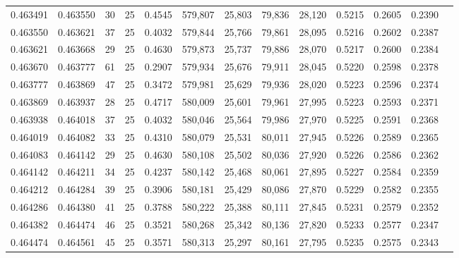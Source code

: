 \begin{tabular}{rrrrrrrrrrrrr}
0.463491 & 0.463550 &    30 &  25 &                                     0.4545 & 579,807 &  25,803 &  79,836 &  28,120 & 0.5215 & 0.2605 & 0.2390 \\
0.463550 & 0.463621 &    37 &  25 &                                     0.4032 & 579,844 &  25,766 &  79,861 &  28,095 & 0.5216 & 0.2602 & 0.2387 \\
0.463621 & 0.463668 &    29 &  25 &                                     0.4630 & 579,873 &  25,737 &  79,886 &  28,070 & 0.5217 & 0.2600 & 0.2384 \\
0.463670 & 0.463777 &    61 &  25 &                                     0.2907 & 579,934 &  25,676 &  79,911 &  28,045 & 0.5220 & 0.2598 & 0.2378 \\
0.463777 & 0.463869 &    47 &  25 &                                     0.3472 & 579,981 &  25,629 &  79,936 &  28,020 & 0.5223 & 0.2596 & 0.2374 \\
0.463869 & 0.463937 &    28 &  25 &                                     0.4717 & 580,009 &  25,601 &  79,961 &  27,995 & 0.5223 & 0.2593 & 0.2371 \\
0.463938 & 0.464018 &    37 &  25 &                                     0.4032 & 580,046 &  25,564 &  79,986 &  27,970 & 0.5225 & 0.2591 & 0.2368 \\
0.464019 & 0.464082 &    33 &  25 &                                     0.4310 & 580,079 &  25,531 &  80,011 &  27,945 & 0.5226 & 0.2589 & 0.2365 \\
0.464083 & 0.464142 &    29 &  25 &                                     0.4630 & 580,108 &  25,502 &  80,036 &  27,920 & 0.5226 & 0.2586 & 0.2362 \\
0.464142 & 0.464211 &    34 &  25 &                                     0.4237 & 580,142 &  25,468 &  80,061 &  27,895 & 0.5227 & 0.2584 & 0.2359 \\
0.464212 & 0.464284 &    39 &  25 &                                     0.3906 & 580,181 &  25,429 &  80,086 &  27,870 & 0.5229 & 0.2582 & 0.2355 \\
0.464286 & 0.464380 &    41 &  25 &                                     0.3788 & 580,222 &  25,388 &  80,111 &  27,845 & 0.5231 & 0.2579 & 0.2352 \\
0.464382 & 0.464474 &    46 &  25 &                                     0.3521 & 580,268 &  25,342 &  80,136 &  27,820 & 0.5233 & 0.2577 & 0.2347 \\
0.464474 & 0.464561 &    45 &  25 &                                     0.3571 & 580,313 &  25,297 &  80,161 &  27,795 & 0.5235 & 0.2575 & 0.2343 \\

\end{tabular}
